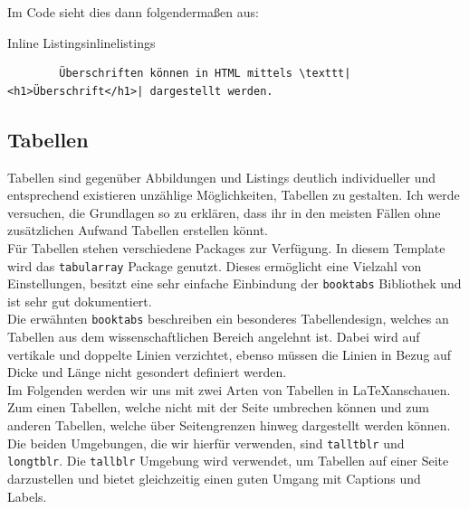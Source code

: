 Im Code sieht dies dann folgendermaßen aus:

\begin{code}{Inline Listings}{inlinelistings}
	\begin{verbatim}
		Überschriften können in HTML mittels \texttt|<h1>Überschrift</h1>| dargestellt werden.
	\end{verbatim}
\end{code}

\subsection{Tabellen}\label{tabellen}

Tabellen sind gegenüber Abbildungen und Listings deutlich individueller und
entsprechend existieren unzählige Möglichkeiten, Tabellen zu gestalten. Ich werde
versuchen, die Grundlagen so zu erklären, dass ihr in den meisten Fällen ohne
zusätzlichen Aufwand Tabellen erstellen könnt.\\ Für Tabellen stehen
verschiedene Packages zur Verfügung. In diesem Template wird das \texttt{tabularray}
Package genutzt. Dieses ermöglicht eine Vielzahl von Einstellungen, besitzt
eine sehr einfache Einbindung der \texttt{booktabs} Bibliothek und ist sehr gut
dokumentiert.\\ Die erwähnten \texttt{booktabs} beschreiben ein besonderes
Tabellendesign, welches an Tabellen aus dem wissenschaftlichen Bereich angelehnt
ist. Dabei wird auf vertikale und doppelte Linien verzichtet, ebenso müssen die
Linien in Bezug auf Dicke und Länge nicht gesondert definiert werden.\\ Im
Folgenden werden wir uns mit zwei Arten von Tabellen in \LaTeX anschauen. Zum
einen Tabellen, welche nicht mit der Seite umbrechen können und zum anderen
Tabellen, welche über Seitengrenzen hinweg dargestellt werden können. Die beiden
Umgebungen, die wir hierfür verwenden, sind \texttt{talltblr} und
\texttt{longtblr}. Die \texttt{tallblr} Umgebung wird verwendet, um Tabellen auf
einer Seite darzustellen und bietet gleichzeitig einen guten Umgang mit Captions
und Labels.


